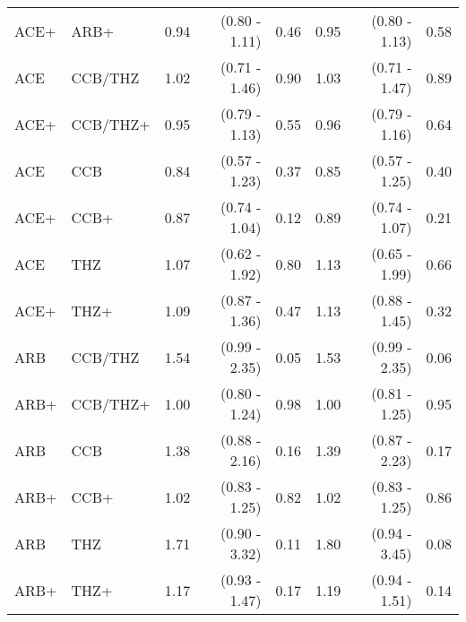 \documentclass[11pt,]{article}
\begin{document}
\begin{table}[H]
{\begin{tabular}{llrrrrrr}
  ACE+ & ARB+ & 0.94 & (0.80 - 1.11) & 0.46 & 0.95 & (0.80 - 1.13) & 0.58 \\ 
  ACE & CCB/THZ & 1.02 & (0.71 - 1.46) & 0.90 & 1.03 & (0.71 - 1.47) & 0.89 \\ 
  ACE+ & CCB/THZ+ & 0.95 & (0.79 - 1.13) & 0.55 & 0.96 & (0.79 - 1.16) & 0.64 \\ 
  ACE & CCB & 0.84 & (0.57 - 1.23) & 0.37 & 0.85 & (0.57 - 1.25) & 0.40 \\ 
  ACE+ & CCB+ & 0.87 & (0.74 - 1.04) & 0.12 & 0.89 & (0.74 - 1.07) & 0.21 \\ 
  ACE & THZ & 1.07 & (0.62 - 1.92) & 0.80 & 1.13 & (0.65 - 1.99) & 0.66 \\ 
  ACE+ & THZ+ & 1.09 & (0.87 - 1.36) & 0.47 & 1.13 & (0.88 - 1.45) & 0.32 \\ 
  ARB & CCB/THZ & 1.54 & (0.99 - 2.35) & 0.05 & 1.53 & (0.99 - 2.35) & 0.06 \\ 
  ARB+ & CCB/THZ+ & 1.00 & (0.80 - 1.24) & 0.98 & 1.00 & (0.81 - 1.25) & 0.95 \\ 
  ARB & CCB & 1.38 & (0.88 - 2.16) & 0.16 & 1.39 & (0.87 - 2.23) & 0.17 \\ 
  ARB+ & CCB+ & 1.02 & (0.83 - 1.25) & 0.82 & 1.02 & (0.83 - 1.25) & 0.86 \\ 
  ARB & THZ & 1.71 & (0.90 - 3.32) & 0.11 & 1.80 & (0.94 - 3.45) & 0.08 \\ 
  ARB+ & THZ+ & 1.17 & (0.93 - 1.47) & 0.17 & 1.19 & (0.94 - 1.51) & 0.14 \\ 
    \bottomrule
  \end{tabular}
  }
\end{table}
\end{document}
